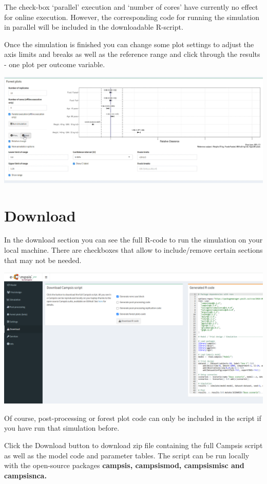 \documentclass[
]{book}
\begin{document}
The check-box `parallel' execution and `number of cores' have currently no effect for online execution. However, the corresponding code for running the simulation in parallel will be included in the downloadable R-script.

Once the simulation is finished you can change some plot settings to adjust the axis limits and breaks as well as the reference range and click through the results - one plot per outcome variable.

\includegraphics{pictures/forest_plot_plot.png}

\chapter{Download}\label{download}

In the download section you can see the full R-code to run the simulation on your local machine. There are checkboxes that allow to include/remove certain sections that may not be needed.

\includegraphics{pictures/Download_section_renv.png}

Of course, post-processing or forest plot code can only be included in the script if you have run that simulation before.

Click the Download button to download zip file containing the full Campsis script as well as the model code and parameter tables. The script can be run locally with the open-source packages \textbf{campsis, campsismod, campsismisc and campsisnca.}
\end{document}

